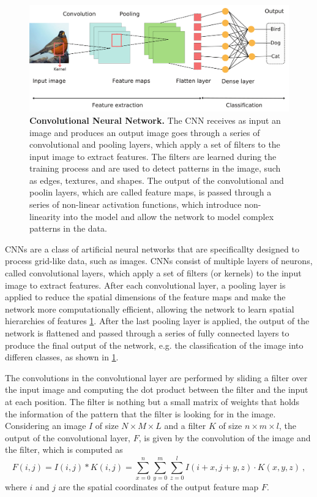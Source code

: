 \begin{figure}[H]
  \centering
  \includegraphics[width=1\textwidth]{Figures/CNN.pdf}
  \caption[Convolutional Neural Network]{
    \textbf{Convolutional Neural Network.} The CNN receives as input an image
    and produces an output image goes through a series of convolutional and
    pooling layers, which apply a set of filters to the input image to extract
    features. The filters are learned during the training process and are used
    to detect patterns in the image, such as edges, textures, and shapes. The
    output of the convolutional and poolin layers, which are called feature
    maps, is passed through a series of non-linear activation functions, which
    introduce non-linearity into the model and allow the network to model
    complex patterns in the data.}
  \label{fig:CNN_scheme}
\end{figure}

CNNs are a class of artificial neural networks that are specificallty designed
to process grid-like data, such as images. CNNs consist of multiple layers of
neurons, called convolutional layers, which apply a set of filters (or kernels)
to the input image to extract features. After each convolutional layer, a
pooling layer is applied to reduce the spatial dimensions of the feature maps
and make the network more computationally efficient, allowing the network to
learn spatial hierarchies of features \cref{fig:CNN_scheme}. After the last
pooling layer is applied, the output of the network is flattened and passed
through a series of fully connected layers to produce the final output of the
network, e.g. the classification of the image into differen classes, as shown
in \cref{fig:CNN_scheme}.

The convolutions in the convolutional layer are performed by sliding a filter
over the input image and computing the dot product between the filter and the
input at each position. The filter is nothing but a small matrix of weights
that holds the information of the pattern that the filter is looking for in the
image. Considering an image $I$ of size $N \times M \times L$ and a filter $K$
of size $n \times m \times l$, the output of the convolutional layer, $F$, is
given by the convolution of the image and the filter, which is computed as
\begin{equation}
  F(i, j) = I(i, j) \ast K(i,
  j)=\sum_{x=0}^{n}\sum_{y=0}^{m}\sum_{z=0}^{l}I(i+x,
  j+y, z)\cdot K(x, y,z) \ ,
\end{equation}
where $i$ and $j$ are the spatial coordinates of the output feature map $F$.

